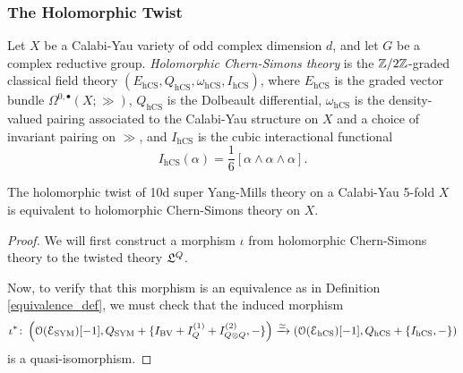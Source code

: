 \documentclass[10pt, oneside]{article}
\begin{document}
\subsubsection{The Holomorphic Twist}

\newcommand{\hCS}{\mathrm{hCS}}

\begin{definition}
Let $X$ be a Calabi-Yau variety of odd complex dimension $d$, and let $G$ be a complex reductive group.  \emph{Holomorphic Chern-Simons theory} is the $\mathbb Z/2\mathbb Z$-graded classical field theory $(E_\hCS, Q_\hCS, \omega_\hCS, I_\hCS)$, where $E_\hCS$ is the graded vector bundle $\Omega^{0,\bullet}(X;\gg)$, $Q_{\hCS}$ is the Dolbeault differential, $\omega_\hCS$ is the density-valued pairing associated to the Calabi-Yau structure on $X$ and a choice of invariant pairing on $\gg$, and $I_\hCS$ is the cubic interactional functional
\[I_{\hCS}(\alpha) = \frac 16 [\alpha \wedge \alpha \wedge \alpha].\]
\end{definition}

\begin{theorem}
The holomorphic twist of 10d super Yang-Mills theory on a Calabi-Yau 5-fold $X$ is equivalent to holomorphic Chern-Simons theory on $X$.
\end{theorem}

\begin{proof}
We will first construct a morphism $\iota$ from holomorphic Chern-Simons theory to the twisted theory $\mathfrak L^Q$. 

Now, to verify that this morphism is an equivalence as in Definition \ref{equivalence_def}, we must check that the induced morphism 
\[\iota^* \colon  \left(\cO(\cE_{\mr{SYM}})[-1], Q_{\mr{SYM}} + \{I_{\mr{BV}} + I^{(1)}_Q + I^{(2)}_{Q\otimes Q},-\} \right) \xto{\simeq} \left(\cO(\cE_\hCS)[-1], Q_\hCS + \{I_\hCS,-\} \right)\]
is a quasi-isomorphism. 

\end{proof}
\end{document}
